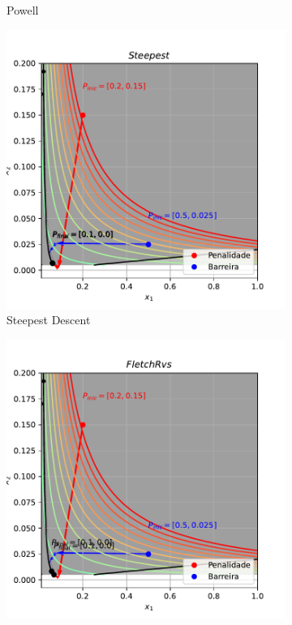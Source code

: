\documentclass[10pt, a4paper]{article}
\begin{document}
\begin{figure}[htpb]
\begin{subfigure}[b]{0.32\textwidth}
    \caption{Powell}
    \label{fig:q4_powell}
  \end{subfigure}
  \hfill
  \begin{subfigure}[b]{0.32\textwidth}
    \centering
    \includegraphics[width=\textwidth]{images/q4_Steepest.pdf}
    \caption{Steepest Descent}
    \label{fig:q4_steepest}
  \end{subfigure}
  \hfill
  \begin{subfigure}[b]{0.32\textwidth}
    \centering
    \includegraphics[width=\textwidth]{images/q4_FletchRvs.pdf}

\end{subfigure}
\end{figure}
\end{document}
